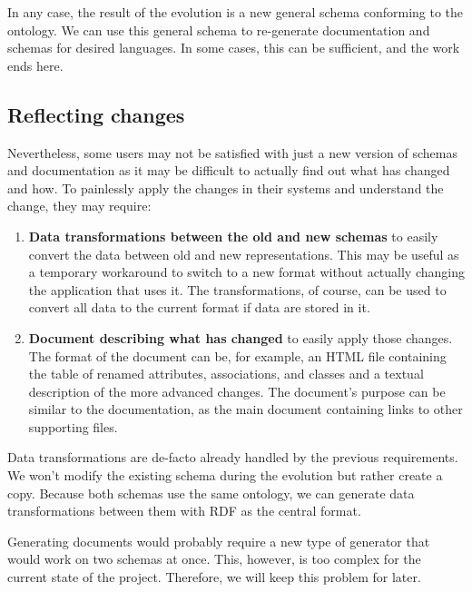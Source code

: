 In any case, the result of the evolution is a new general schema conforming to the ontology. We can use this general schema to re-generate documentation and schemas for desired languages. In some cases, this can be sufficient, and the work ends here.

\subsection*{Reflecting changes}

Nevertheless, some users may not be satisfied with just a new version of schemas and documentation as it may be difficult to actually find out what has changed and how. To painlessly apply the changes in their systems and understand the change, they may require:

\begin{enumerate}
    \item \textbf{Data transformations between the old and new schemas} to easily convert the data between old and new representations. This may be useful as a temporary workaround to switch to a new format without actually changing the application that uses it. The transformations, of course, can be used to convert all data to the current format if data are stored in it.
    \item \textbf{Document describing what has changed} to easily apply those changes. The format of the document can be, for example, an HTML file containing the table of renamed attributes, associations, and classes and a textual description of the more advanced changes. The document's purpose can be similar to the documentation, as the main document containing links to other supporting files.
\end{enumerate}

Data transformations are de-facto already handled by the previous requirements. We won't modify the existing schema during the evolution but rather create a copy. Because both schemas use the same ontology, we can generate data transformations between them with RDF as the central format.

Generating documents would probably require a new type of generator that would work on two schemas at once. This, however, is too complex for the current state of the project. Therefore, we will keep this problem for later.
